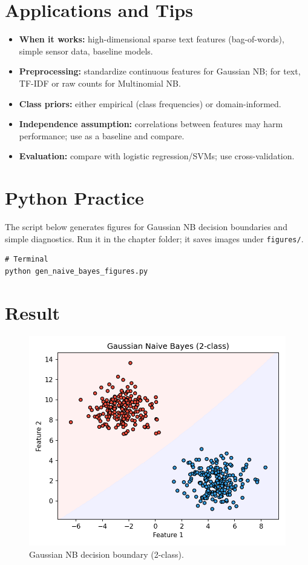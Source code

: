 \documentclass[11pt]{article}
\begin{document}
\section{Applications and Tips}
\begin{itemize}
  \item \textbf{When it works:} high-dimensional sparse text features (bag-of-words), simple sensor data, baseline models.
  \item \textbf{Preprocessing:} standardize continuous features for Gaussian NB; for text, TF-IDF or raw counts for Multinomial NB.
  \item \textbf{Class priors:} either empirical (class frequencies) or domain-informed.
  \item \textbf{Independence assumption:} correlations between features may harm performance; use as a baseline and compare.
  \item \textbf{Evaluation:} compare with logistic regression/SVMs; use cross-validation.
\end{itemize}

\section{Python Practice}
The script below generates figures for Gaussian NB decision boundaries and simple diagnostics. Run it in the chapter folder; it saves images under \texttt{figures/}.

\begin{lstlisting}[style=code,caption={Generate Naive Bayes figures},label={lst:genfigs}]
# Terminal
python gen_naive_bayes_figures.py
\end{lstlisting}

\section{Result}
\begin{figure}[H]
  \centering
  \includegraphics[width=0.9\linewidth]{gnb_decision_boundary_2class.png}
  \caption{Gaussian NB decision boundary (2-class).}
  \label{fig:gnb2}
\end{figure}
\FloatBarrier
\end{document}
